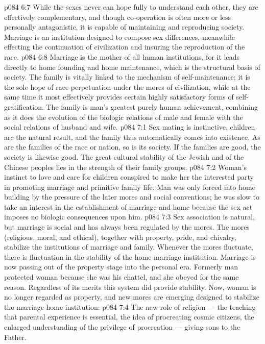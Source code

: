 \vs p084 6:7 \pc While the sexes never can hope fully to understand each other, they are effectively complementary, and though co\hyp{}operation is often more or less personally antagonistic, it is capable of maintaining and reproducing society. Marriage is an institution designed to compose sex differences, meanwhile effecting the continuation of civilization and insuring the reproduction of the race.
\vs p084 6:8 Marriage is the mother of all human institutions, for it leads directly to home founding and home maintenance, which is the structural basis of society. The family is vitally linked to the mechanism of self\hyp{}maintenance; it is the sole hope of race perpetuation under the mores of civilization, while at the same time it most effectively provides certain highly satisfactory forms of self\hyp{}gratification. The family is man’s greatest purely human achievement, combining as it does the evolution of the biologic relations of male and female with the social relations of husband and wife.
\vs p084 7:1 Sex mating is instinctive, children are the natural result, and the family thus automatically comes into existence. As are the families of the race or nation, so is its society. If the families are good, the society is likewise good. The great cultural stability of the Jewish and of the Chinese peoples lies in the strength of their family groups.
\vs p084 7:2 Woman’s instinct to love and care for children conspired to make her the interested party in promoting marriage and primitive family life. Man was only forced into home building by the pressure of the later mores and social conventions; he was slow to take an interest in the establishment of marriage and home because the sex act imposes no biologic consequences upon him.
\vs p084 7:3 Sex association is natural, but marriage is social and has always been regulated by the mores. The mores (religious, moral, and ethical), together with property, pride, and chivalry, stabilize the institutions of marriage and family. Whenever the mores fluctuate, there is fluctuation in the stability of the home\hyp{}marriage institution. Marriage is now passing out of the property stage into the personal era. Formerly man protected woman because she was his chattel, and she obeyed for the same reason. Regardless of its merits this system did provide stability. Now, woman is no longer regarded as property, and new mores are emerging designed to stabilize the marriage\hyp{}home institution:
\vs p084 7:4 \bibnobreakspace The new role of religion --- the teaching that parental experience is essential, the idea of procreating cosmic citizens, the enlarged understanding of the privilege of procreation --- giving sons to the Father.
